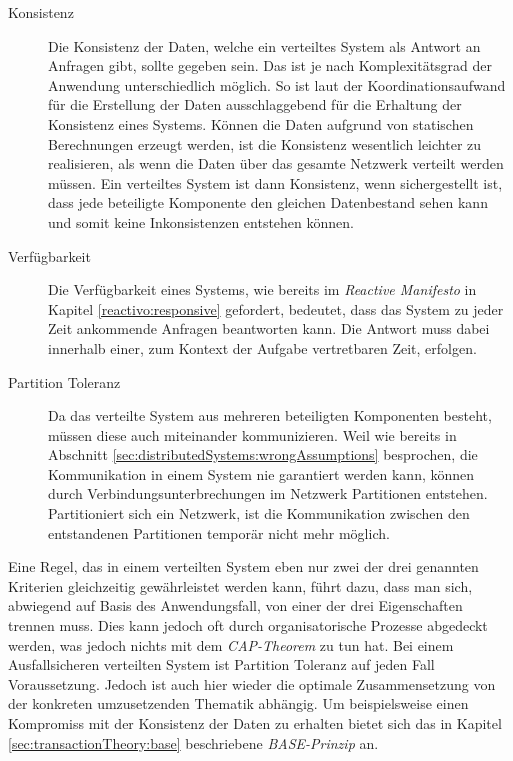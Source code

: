 \begin{description}
\item[Konsistenz]
Die Konsistenz der Daten, welche ein verteiltes System als Antwort an Anfragen gibt, sollte gegeben sein. Das ist je nach Komplexitätsgrad der Anwendung unterschiedlich möglich. So ist laut \cite{gilbertPerspectiveCAPTheorem2012} der Koordinationsaufwand für die Erstellung der Daten ausschlaggebend für die Erhaltung der Konsistenz eines Systems. Können die Daten aufgrund von statischen Berechnungen erzeugt werden, ist die Konsistenz wesentlich leichter zu realisieren, als wenn die Daten über das gesamte Netzwerk verteilt werden müssen. Ein verteiltes System ist dann Konsistenz, wenn sichergestellt ist, dass jede beteiligte Komponente den gleichen Datenbestand sehen kann und somit keine Inkonsistenzen entstehen können.   

\item[Verfügbarkeit]
Die Verfügbarkeit eines Systems, wie bereits im {\textit{Reactive Manifesto}} in Kapitel \ref{reactivo:responsive} gefordert, bedeutet, dass das System zu jeder Zeit ankommende Anfragen beantworten kann. Die Antwort muss dabei innerhalb einer, zum Kontext der Aufgabe vertretbaren Zeit, erfolgen.

\item[Partition Toleranz]
Da das verteilte System aus mehreren beteiligten Komponenten besteht, müssen diese auch miteinander kommunizieren. Weil wie bereits in Abschnitt \ref{sec:distributedSystems:wrongAssumptions} besprochen, die Kommunikation in einem System nie garantiert werden kann, können durch Verbindungsunterbrechungen im Netzwerk Partitionen entstehen. Partitioniert sich ein Netzwerk, ist die Kommunikation zwischen den entstandenen Partitionen temporär nicht mehr möglich.
\end{description}
Eine Regel, das in einem verteilten System eben nur zwei der drei genannten Kriterien gleichzeitig gewährleistet werden kann, führt dazu, dass man sich, abwiegend auf Basis des Anwendungsfall, von einer der drei Eigenschaften trennen muss. Dies kann jedoch oft durch organisatorische Prozesse abgedeckt werden, was jedoch nichts mit dem \textit{CAP-Theorem} zu tun hat. Bei einem Ausfallsicheren verteilten System ist Partition Toleranz auf jeden Fall Voraussetzung. Jedoch ist auch hier wieder die optimale Zusammensetzung von der konkreten umzusetzenden Thematik abhängig. Um beispielsweise einen Kompromiss mit der Konsistenz der Daten zu erhalten bietet sich das in Kapitel \ref{sec:transactionTheory:base} beschriebene \textit{BASE-Prinzip} an.